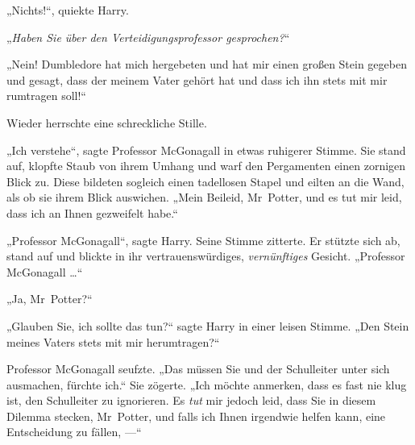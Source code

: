 „Nichts!“, quiekte Harry.

„\emph{Haben Sie über den Verteidigungsprofessor gesprochen?}“

„Nein! Dumbledore hat mich hergebeten und hat mir einen großen Stein gegeben und gesagt, dass der meinem Vater gehört hat und dass ich ihn stets mit mir rumtragen soll!“

Wieder herrschte eine schreckliche Stille.

„Ich verstehe“, sagte Professor McGonagall in etwas ruhigerer Stimme. Sie stand auf, klopfte Staub von ihrem Umhang und warf den Pergamenten einen zornigen Blick zu. Diese bildeten sogleich einen tadellosen Stapel und eilten an die Wand, als ob sie ihrem Blick auswichen.
„Mein Beileid, Mr~Potter, und es tut mir leid, dass ich an Ihnen gezweifelt habe.“

„Professor McGonagall“, sagte Harry. Seine Stimme zitterte. Er stützte sich ab, stand auf und blickte in ihr vertrauenswürdiges, \emph{vernünftiges} Gesicht.
„Professor McGonagall …“

„Ja, Mr~Potter?“

„Glauben Sie, ich sollte das tun?“ sagte Harry in einer leisen Stimme.
„Den Stein meines Vaters stets mit mir herumtragen?“

Professor McGonagall seufzte.
„Das müssen Sie und der Schulleiter unter sich ausmachen, fürchte ich.“ Sie zögerte.
„Ich möchte anmerken, dass es fast nie klug ist, den Schulleiter zu ignorieren. Es \emph{tut} mir jedoch leid, dass Sie in diesem Dilemma stecken, Mr~Potter, und falls ich Ihnen irgendwie helfen kann, eine Entscheidung zu fällen, —“

